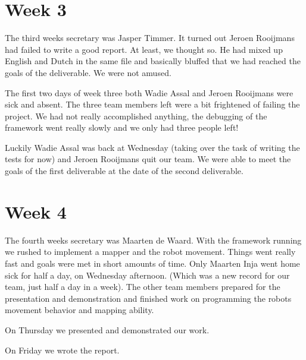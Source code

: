 \documentclass[a4paper,10pt]{article}
\begin{document}
\section{Week 3}
The third weeks secretary was Jasper Timmer. 
It turned out Jeroen Rooijmans had failed to write a good report. At least, we thought so. He had mixed up English 
and Dutch in the same file and basically bluffed that we had reached the goals of the deliverable. We were not amused. 

The first two days of week three both Wadie Assal and Jeroen Rooijmans were sick and absent. The three team members left
were a bit frightened of failing the project. We had not really accomplished anything, the debugging of the framework
went really slowly and we only had three people left! 

Luckily Wadie Assal was back at Wednesday (taking over the task of writing the tests for now) and Jeroen Rooijmans quit our team. 
We were able to meet the goals of the first deliverable at the date of 
the second deliverable. 

\section{Week 4}
The fourth weeks secretary was Maarten de Waard. With the framework running we rushed to implement a mapper and 
the robot movement. Things went really fast and goals were met in short amounts of time. Only Maarten Inja 
went home sick for half a day, on Wednesday afternoon. (Which was a new record for our team, just half a day in a week).
The other team members prepared for the presentation and demonstration and finished work on programming the robots
movement behavior and mapping ability.

On Thursday we presented and demonstrated our work. 

On Friday we wrote the report. 
\end{document}
